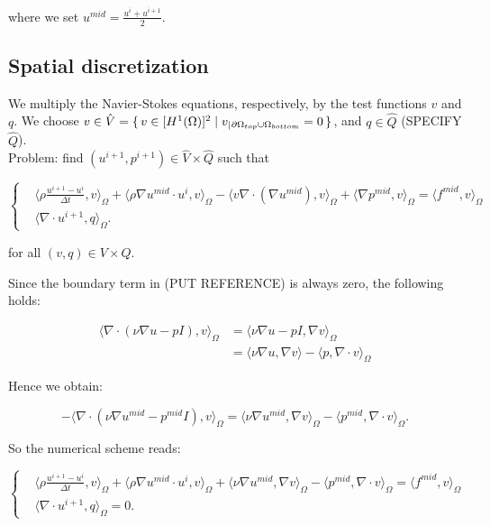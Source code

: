 \documentclass[11pt,a4paper,titlepage]{report}
\begin{document}
where we set $u^{mid} = \frac{u^i + u^{i+1}}{2}$.

\subsection{Spatial discretization}
We multiply the Navier-Stokes equations, respectively, by the test functions $v$ and $q$. We choose $v \in \hat{V} = \set{v \in [H^1(\Omega)]^2 | v_|{_{\partial \Omega_{top} \cup \Omega_{bottom}}} = 0}$, and $q \in \hat{Q}$ (SPECIFY $\hat{Q}$). \\
Problem: find $(u^{i+1}, p^{i+1}) \in \hat{V} \times \hat{Q}$ such that

\[
\left\{
\begin{aligned}
& \langle \rho \frac{u^{i+1} - u^i}{\Delta t},v \rangle_\Omega
+ \langle \rho \nabla u^{mid} \cdot u^i  ,v \rangle_\Omega
- \langle v \nabla \cdot (\nabla u^{mid}) ,v \rangle_\Omega
+ \langle \nabla p^{mid} ,v \rangle_\Omega = \langle f^{mid} ,v \rangle_\Omega \\
& \langle \nabla \cdot u^{i+1},q \rangle_\Omega.
\end{aligned}
\right.
\]

for all $(v,q) \in V \times Q$.

Since the boundary term in (PUT REFERENCE) is always zero, the following holds:

\[
\begin{aligned}
\langle \nabla \cdot (\nu \nabla u - pI) ,v \rangle_\Omega & = \langle \nu \nabla u - pI ,\nabla v \rangle_\Omega \\
														& = \langle \nu \nabla u  ,\nabla v \rangle  - \langle p ,\nabla \cdot v \rangle_\Omega
\end{aligned}
\]

Hence we obtain:

\[
- \langle \nabla \cdot (\nu \nabla u^{mid} - p^{mid}I) ,v \rangle_{\Omega} = \langle \nu \nabla u^{mid}, \nabla v \rangle_\Omega -  \langle p^{mid}, \nabla \cdot v \rangle_\Omega.
\]

So the numerical scheme reads:

\[
\left\{
\begin{aligned}
& \langle \rho \frac{u^{i+1} - u^i}{\Delta t},v \rangle_\Omega
+ \langle \rho \nabla u^{mid} \cdot u^i  ,v \rangle_\Omega
+ \langle \nu \nabla u^{mid}, \nabla v \rangle_\Omega
- \langle p^{mid} , \nabla \cdot v \rangle_\Omega = \langle f^{mid} ,v \rangle_\Omega \\
& \langle \nabla \cdot u^{i+1},q \rangle_\Omega =  0.
\end{aligned}
\right.
\]
\end{document}
